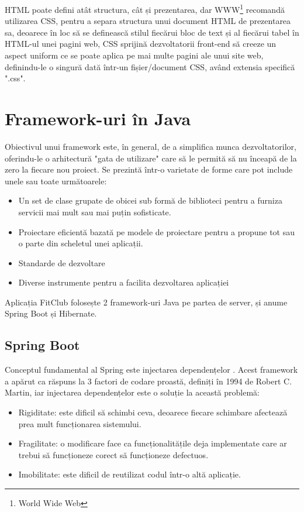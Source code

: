 HTML poate defini atât structura, cât și prezentarea, dar WWW\footnote{World Wide Web} recomandă utilizarea CSS, pentru a separa structura unui document HTML de prezentarea sa, deoarece în loc să se definească stilul fiecărui bloc de text și al fiecărui tabel în HTML-ul unei pagini web, CSS sprijină dezvoltatorii front-end să creeze un aspect uniform ce se poate aplica pe mai multe pagini ale unui site web, definindu-le o singură dată într-un fișier/document CSS, având extensia specifică ".css".\newline

\section{Framework-uri în Java}
Obiectivul unui framework \cite{.javaframework} este, în general, de a simplifica munca dezvoltatorilor, oferindu-le o arhitectură "gata de utilizare" care să le permită să nu înceapă de la zero la fiecare nou proiect. Se prezintă într-o varietate de forme care pot include unele sau toate următoarele:

\begin{itemize}
	\item{Un set de clase grupate de obicei sub formă de biblioteci pentru a furniza servicii mai mult sau mai puțin sofisticate.}
	\item{Proiectare eficientă bazată pe modele de proiectare pentru a propune tot sau o parte din scheletul unei aplicații.}
	\item{Standarde de dezvoltare}
	\item{Diverse instrumente pentru a facilita dezvoltarea aplicației}
	\newline
\end{itemize}

Aplicația FitClub folosește 2 framework-uri Java pe partea de server, și anume Spring Boot și Hibernate.\newline


\subsection{Spring Boot}
Conceptul fundamental al Spring este injectarea dependențelor \cite{.javaspringbook}.
Acest framework a apărut ca răspuns la 3 factori de codare proastă, definiți în 1994 de Robert C. Martin, iar injectarea dependențelor este o soluție la această problemă:

\begin{itemize}
	\item{Rigiditate: este dificil să schimbi ceva, deoarece fiecare schimbare afectează prea mult funcționarea sistemului.}
	\item{Fragilitate: o modificare face ca funcționalitățile deja implementate care ar trebui să funcționeze corect să funcționeze defectuos.}
	\item{Imobilitate: este dificil de reutilizat codul într-o altă aplicație.}
	\newline
\end{itemize}

